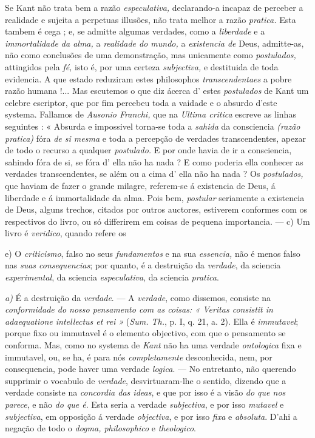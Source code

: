 Se Kant não trata bem a razão \emph{especulativa,} declarando-a incapaz de perceber a realidade e sujeita a perpetuas illusões, não trata melhor a razão \emph{pratica.} Esta tambem é cega ; e, se admitte algumas verdades, como a \emph{liberdade} e a \emph{immortalidade da alma,} a \emph{realidade do mundo,} a \emph{existencia de} Deus, admitte-as, não como conclusões de uma demonstração, mas unicamente como \emph{postulados,} attingidos pela \emph{fé,} isto é, por uma certeza \emph{subjectiva,} e destituida de toda evidencia. A que estado reduziram estes philosophos \emph{transcendentaes} a pobre razão humana !... Mas escutemos o que diz ácerca d' estes \emph{postulados} de Kant um celebre escriptor, que por fim percebeu toda a vaidade e o absurdo d'este systema. Fallamos de \emph{Ausonio Franchi,} que na \emph{Ultima critica} escreve as linhas seguintes : « Absurda e impossivel torna-se toda a \emph{sahida} da consciencia \emph{(razão pratica)} fóra \emph{de si mesma} e toda a percepção de verdades transcendentes, apezar de todo o recurso a qualquer \emph{postulado.} E por onde havia de ir a consciencia, sahindo fóra de si, se fóra d' ella não ha nada ? E como poderia ella conhecer as verdades transcendentes, se além ou a cima d' ella não ha nada ? Os \emph{postulados,} que haviam de fazer o grande milagre, referem-se á existencia de Deus, á liberdade e á immortalidade da alma. Pois bem, \emph{postular} seriamente a existencia de Deus,   alguns trechos, citados por outros auctores, estiverem conformes com os respectivos do livro, ou só differirem em coisas de pequena importancia. --- c) Um livro é \emph{veridico}, quando refere os

e) O \emph{criticismo}, falso no seus \emph{fundamentos} e na sua \emph{essencia,} não é menos falso nas \emph{suas consequencias}; por quanto, é a destruição da \emph{verdade}, da sciencia \emph{experimental}, da sciencia \emph{especulativa}, da sciencia \emph{pratica}.

\emph{a)} É a destruição da \emph{verdade}. --- A \emph{verdade}, como dissemos, consiste na \emph{conformidade do nosso pensamento com as coisas: « Veritas consistit in adaequatione intellectus et rei »} (\emph{Sum. Th.}, p. I, q. 21, a. 2). Ella é \emph{immutavel}; porque fixo ou immutavel é o elemento objectivo, com que o pensamento se conforma. Mas, como no systema de \emph{Kant} não ha uma verdade \emph{ontologica} fixa e immutavel, ou, se ha, é para nós \emph{completamente} desconhecida, nem, por consequencia, pode haver uma verdade \emph{logica}. --- No entretanto, não querendo supprimir o vocabulo de \emph{verdade}, desvirtuaram-lhe o sentido, dizendo que a verdade consiste na \emph{concordia das ideas}, e que por isso é a visão \emph{do que nos parece}, e não \emph{do que é}. Esta seria a verdade \emph{subjectiva}, e por isso \emph{mutavel} e \emph{subjectiva}, em opposição á verdade \emph{objectiva}, e por isso \emph{fixa} e \emph{absoluta}. D'ahi a negação de todo o \emph{dogma, philosophico} e \emph{theologico}.

